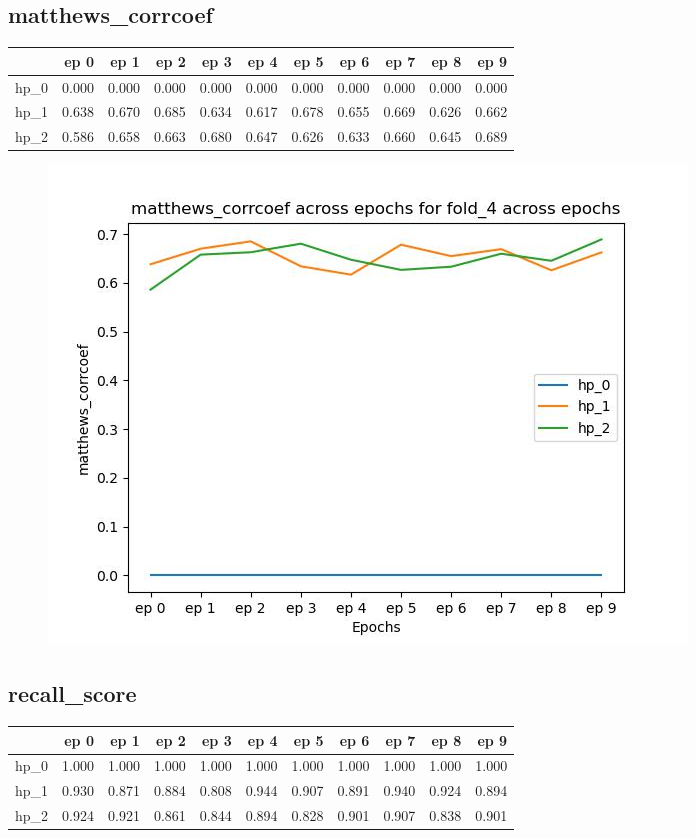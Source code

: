 \documentclass{article}
\begin{document}
\subsection{matthews\_corrcoef}
\begin{tabular}{lrrrrrrrrrr}
\toprule
{} &   ep 0 &   ep 1 &   ep 2 &   ep 3 &   ep 4 &   ep 5 &   ep 6 &   ep 7 &   ep 8 &   ep 9 \\
\midrule
hp\_0 &  0.000 &  0.000 &  0.000 &  0.000 &  0.000 &  0.000 &  0.000 &  0.000 &  0.000 &  0.000 \\
hp\_1 &  0.638 &  0.670 &  0.685 &  0.634 &  0.617 &  0.678 &  0.655 &  0.669 &  0.626 &  0.662 \\
hp\_2 &  0.586 &  0.658 &  0.663 &  0.680 &  0.647 &  0.626 &  0.633 &  0.660 &  0.645 &  0.689 \\
\bottomrule
\end{tabular}

\begin{figure}[H]
\includegraphics[scale = 0.75]{fold_4/matthews_corrcoef}
\end{figure}
\subsection{recall\_score}
\begin{tabular}{lrrrrrrrrrr}
\toprule
{} &   ep 0 &   ep 1 &   ep 2 &   ep 3 &   ep 4 &   ep 5 &   ep 6 &   ep 7 &   ep 8 &   ep 9 \\
\midrule
hp\_0 &  1.000 &  1.000 &  1.000 &  1.000 &  1.000 &  1.000 &  1.000 &  1.000 &  1.000 &  1.000 \\
hp\_1 &  0.930 &  0.871 &  0.884 &  0.808 &  0.944 &  0.907 &  0.891 &  0.940 &  0.924 &  0.894 \\
hp\_2 &  0.924 &  0.921 &  0.861 &  0.844 &  0.894 &  0.828 &  0.901 &  0.907 &  0.838 &  0.901 \\
\bottomrule
\end{tabular}
\end{document}
